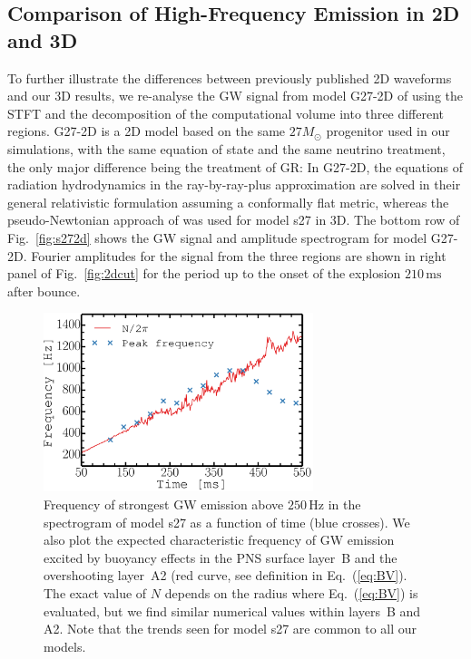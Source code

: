 \subsection{\comment Comparison of High-Frequency Emission in 2D and 3D}
To further illustrate the differences between previously published 2D waveforms and our 3D results, we
re-analyse the GW signal from model G27-2D of \citet{mueller_13} using
the STFT and the decomposition of the computational volume into three
different regions. G27-2D is a 2D model based on the same $27 M_\odot$
progenitor used in our simulations, with the same equation of state
and the same neutrino treatment, the only major difference being the
treatment of GR: In G27-2D, the equations of radiation hydrodynamics in
the ray-by-ray-plus approximation are solved in their general
relativistic formulation assuming a conformally flat metric, whereas
the pseudo-Newtonian approach of \citet{marek_06} was used for model s27
in 3D. The bottom row of Fig.~\ref{fig:s272d} shows the GW signal and amplitude spectrogram for model G27-2D.
Fourier amplitudes for the signal from the three regions are shown in right panel of Fig.~\ref{fig:2dcut}
{for the period up to the onset of the explosion $210 \, \mathrm{ms}$ after bounce}.
\begin{figure}
\centering
\includegraphics[width=0.70\textwidth]{./images/paper1/fig7.pdf}
\caption{Frequency of strongest GW emission
above $250 \, \mathrm{Hz}$ in the spectrogram of model s27 as a function of time (blue crosses).
We also plot the expected characteristic frequency of GW emission excited by buoyancy effects
in the PNS surface layer~B and the overshooting layer~A2 (red curve, see definition in Eq.~(\ref{eq:BV}).
The exact value of $N$ depends on the radius where Eq.~(\ref{eq:BV}) is evaluated, 
but we find similar numerical values within layers~B and A2. Note that the trends seen for model s27 are common to all our models.
\label{fig:fpeak}}
\end{figure}

